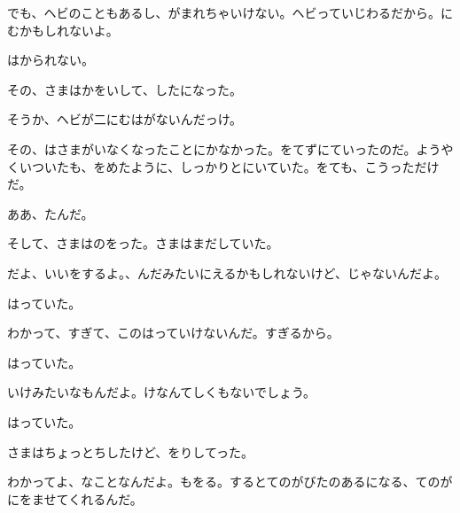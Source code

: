 でも、ヘビのこともあるし、がまれちゃいけない。ヘビっていじわるだから。にむかもしれないよ。

はかられない。

その、さまはかをいして、したになった。

そうか、ヘビが二にむはがないんだっけ。

その、はさまがいなくなったことにかなかった。をてずにていったのだ。ようやくいついたも、をめたように、しっかりとにいていた。をても、こうっただけだ。

ああ、たんだ。

そして、さまはのをった。さまはまだしていた。

だよ、いいをするよ。、んだみたいにえるかもしれないけど、じゃないんだよ。

はっていた。

わかって、すぎて、このはっていけないんだ。すぎるから。

はっていた。

いけみたいなもんだよ。けなんてしくもないでしょう。

はっていた。

さまはちょっとちしたけど、をりしてった。

わかってよ、なことなんだよ。もをる。するとてのがびたのあるになる、てのがにをませてくれるんだ。


